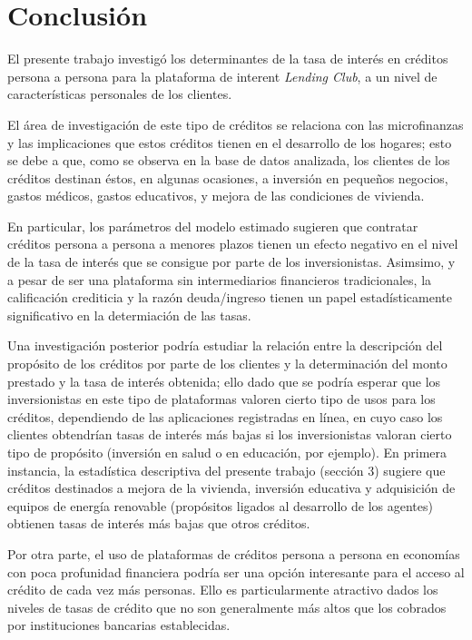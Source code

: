 \documentclass[12pt, fleqn, letterpaper, oneside]{amsart}
\begin{document}
\section{Conclusión}
El presente trabajo investigó los determinantes de la tasa de interés en créditos persona a persona para la plataforma de interent \emph{Lending Club}, a un nivel de características personales de los clientes.

El área de investigación de este tipo de créditos se relaciona con las microfinanzas y las implicaciones que estos créditos tienen en el desarrollo de los hogares; esto se debe a que, como se observa en la base de datos analizada, los clientes de los créditos destinan éstos, en algunas ocasiones, a inversión en pequeños negocios, gastos médicos, gastos educativos, y mejora de las condiciones de vivienda. 

En particular, los parámetros del modelo estimado sugieren que contratar créditos persona a persona a menores plazos tienen un efecto negativo en el nivel de la tasa de interés que se consigue por parte de los inversionistas. Asimsimo, y a pesar de ser una plataforma sin intermediarios financieros tradicionales, la calificación crediticia y la razón deuda/ingreso tienen un papel estadísticamente significativo en la determiación de las tasas. 

Una investigación posterior podría estudiar la relación entre la descripción del propósito de los créditos por parte de los clientes y la determinación del monto prestado y la tasa de interés obtenida; ello dado que se podría esperar que los inversionistas en este tipo de plataformas valoren cierto tipo de usos para los créditos, dependiendo de las aplicaciones registradas en línea, en cuyo caso los clientes obtendrían tasas de interés más bajas si los inversionistas valoran cierto tipo de propósito (inversión en salud o en educación, por ejemplo). En primera instancia, la estadística descriptiva del presente trabajo (sección 3) sugiere que créditos destinados a mejora de la vivienda, inversión educativa y adquisición de equipos de energía renovable (propósitos ligados al desarrollo de los agentes) obtienen tasas de interés más bajas que otros créditos.

Por otra parte, el uso de plataformas de créditos persona a persona en economías con poca profunidad financiera podría ser una opción interesante para el acceso al crédito de cada vez más personas. Ello es particularmente atractivo dados los niveles de tasas de crédito que no son generalmente más altos que los cobrados por instituciones bancarias establecidas. 


\end{document}
